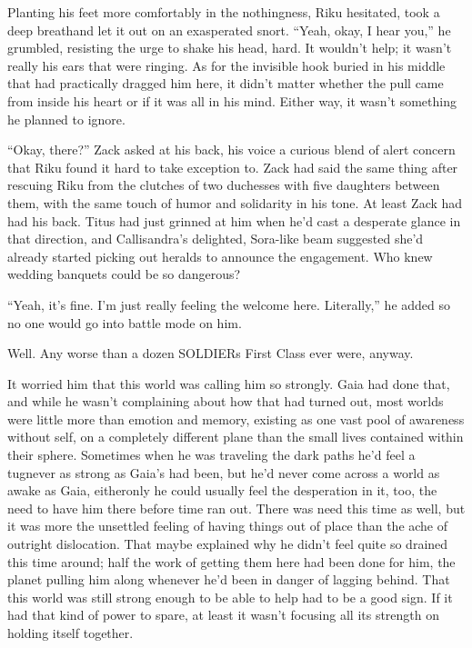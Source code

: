 \renewcommand{\pfbreakdisplay}{%
\ding{94}\quad\ding{94}\quad\ding{94}}

Planting his feet more comfortably in the nothingness, Riku hesitated, took a deep breath\textemdash and let it out on an exasperated snort. ``Yeah, okay, I hear you,'' he grumbled, resisting the urge to shake his head, hard. It wouldn't help; it wasn't really his ears that were ringing. As for the invisible hook buried in his middle that had practically dragged him here, it didn't matter whether the pull came from inside his heart or if it was all in his mind. Either way, it wasn't something he planned to ignore.

``Okay, there?'' Zack asked at his back, his voice a curious blend of alert concern that Riku found it hard to take exception to. Zack had said the same thing after rescuing Riku from the clutches of two duchesses with five daughters between them, with the same touch of humor and solidarity in his tone. At least Zack had had his back. Titus had just grinned at him when he'd cast a desperate glance in that direction, and Callisandra's delighted, Sora-like beam suggested she'd already started picking out heralds to announce the engagement. Who knew wedding banquets could be so dangerous?

``Yeah, it's fine. I'm just really feeling the welcome here. Literally,'' he added so no one would go into battle mode on him.

Well. Any worse than a dozen SOLDIERs First Class ever were, anyway.

It worried him that this world was calling him so strongly. Gaia had done that, and while he wasn't complaining about how that had turned out, most worlds were little more than emotion and memory, existing as one vast pool of awareness without self, on a completely different plane than the small lives contained within their sphere. Sometimes when he was traveling the dark paths he'd feel a tug\textemdash never as strong as Gaia's had been, but he'd never come across a world as awake as Gaia, either\textemdash only he could usually feel the desperation in it, too, the need to have him there before time ran out. There was need this time as well, but it was more the unsettled feeling of having things out of place than the ache of outright dislocation. That maybe explained why he didn't feel quite so drained this time around; half the work of getting them here had been done for him, the planet pulling him along whenever he'd been in danger of lagging behind. That this world was still strong enough to be able to help had to be a good sign. If it had that kind of power to spare, at least it wasn't focusing all its strength on holding itself together.

